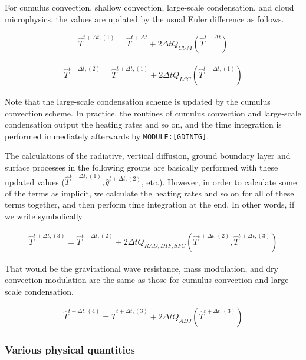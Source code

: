 For cumulus convection, shallow convection, large-scale condensation,
and cloud microphysics, the values are updated by the usual Euler
difference as follows.

\begin{eqnarray}
  \hat{T}^{t+\Delta t,(1)} = \hat{T}^{t+\Delta t}
                         +  2 \Delta t Q_{CUM}(\hat{T}^{t+\Delta t})
\end{eqnarray}

\begin{eqnarray}
  \hat{T}^{t+\Delta t,(2)} = \hat{T}^{t+\Delta t,(1)}
                         +  2 \Delta t Q_{LSC}(\hat{T}^{t+\Delta t,(1)})
\end{eqnarray}

Note that the large-scale condensation scheme is updated by the cumulus
convection scheme. In practice, the routines of cumulus convection and
large-scale condensation output the heating rates and so on, and the
time integration is performed immediately afterwards by
\texttt{MODULE:{[}GDINTG{]}}.

The calculations of the radiative, vertical diffusion, ground boundary
layer and surface processes in the following groups are basically
performed with these updated values
(\(\hat{T}^{t+\Delta t,(1)}, \hat{q}^{t+\Delta t,(2)}\), etc.). However,
in order to calculate some of the terms as implicit, we calculate the
heating rates and so on for all of these terms together, and then
perform time integration at the end. In other words, if we write
symbolically

\begin{eqnarray}
  \hat{T}^{t+\Delta t,(3)} = \hat{T}^{t+\Delta t,(2)}
              + 2 \Delta t Q_{RAD,DIF,SFC}
               (\hat{T}^{t+\Delta t,(2)},\hat{T}^{t+\Delta t,(3)})
\end{eqnarray}

That would be the gravitational wave resistance, mass modulation, and
dry convection modulation are the same as those for cumulus convection
and large-scale condensation.

\begin{eqnarray}
  \hat{T}^{t+\Delta t,(4)} = \hat{T}^{t+\Delta t,(3)}
              +  2 \Delta t Q_{ADJ}(\hat{T}^{t+\Delta t,(3)})
\end{eqnarray}

\hypertarget{various-physical-quantities}{%
\subsubsection{Various physical
quantities}\label{various-physical-quantities}}

